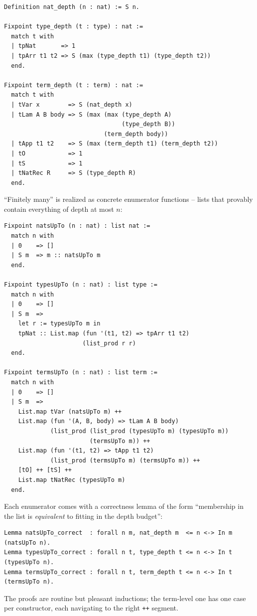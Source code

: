 \documentclass[11pt,a4paper]{article}
\theoremstyle{plain}
\theoremstyle{definition}
\theoremstyle{remark}
\begin{document}
\begin{lstlisting}
Definition nat_depth (n : nat) := S n.

Fixpoint type_depth (t : type) : nat :=
  match t with
  | tpNat       => 1
  | tpArr t1 t2 => S (max (type_depth t1) (type_depth t2))
  end.

Fixpoint term_depth (t : term) : nat :=
  match t with
  | tVar x        => S (nat_depth x)
  | tLam A B body => S (max (max (type_depth A)
                                 (type_depth B))
                            (term_depth body))
  | tApp t1 t2    => S (max (term_depth t1) (term_depth t2))
  | tO            => 1
  | tS            => 1
  | tNatRec R     => S (type_depth R)
  end.
\end{lstlisting}

``Finitely many'' is realized as concrete enumerator functions --
lists that provably contain everything of depth at most $n$:

\begin{lstlisting}
Fixpoint natsUpTo (n : nat) : list nat :=
  match n with
  | 0    => []
  | S m  => m :: natsUpTo m
  end.

Fixpoint typesUpTo (n : nat) : list type :=
  match n with
  | 0    => []
  | S m  =>
    let r := typesUpTo m in
    tpNat :: List.map (fun '(t1, t2) => tpArr t1 t2)
                      (list_prod r r)
  end.

Fixpoint termsUpTo (n : nat) : list term :=
  match n with
  | 0    => []
  | S m  =>
    List.map tVar (natsUpTo m) ++
    List.map (fun '(A, B, body) => tLam A B body)
             (list_prod (list_prod (typesUpTo m) (typesUpTo m))
                        (termsUpTo m)) ++
    List.map (fun '(t1, t2) => tApp t1 t2)
             (list_prod (termsUpTo m) (termsUpTo m)) ++
    [tO] ++ [tS] ++
    List.map tNatRec (typesUpTo m)
  end.
\end{lstlisting}

Each enumerator comes with a correctness lemma of the form
``membership in the list is \emph{equivalent} to fitting in the depth
budget'':

\begin{lstlisting}
Lemma natsUpTo_correct  : forall n m, nat_depth m  <= n <-> In m (natsUpTo n).
Lemma typesUpTo_correct : forall n t, type_depth t <= n <-> In t (typesUpTo n).
Lemma termsUpTo_correct : forall n t, term_depth t <= n <-> In t (termsUpTo n).
\end{lstlisting}

The proofs are routine but pleasant inductions; the term-level one has
one case per constructor, each navigating to the right \texttt{++}
segment.
\end{document}
